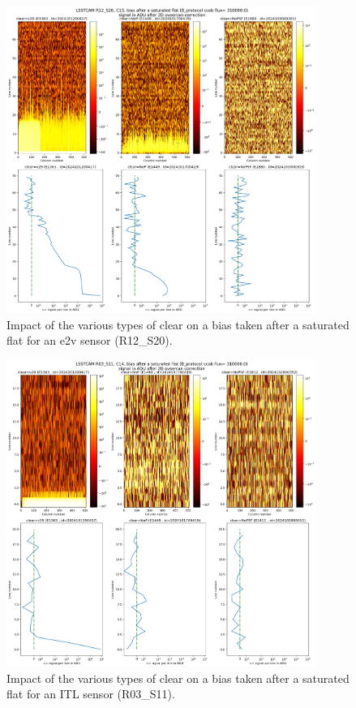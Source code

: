 \begin{figure}
\begin{centering}
\includegraphics[width=0.9\textwidth]{sections/figures/plots_R12_S20_C15_E1880_bias_2024103000303.png}
\end{centering}
\caption{Impact of the various types of clear on a bias
taken after a saturated flat for an e2v sensor (R12\_S20).}
\label{fig:clear_e2v}
\end{figure}


\begin{figure}
\begin{centering}
\includegraphics[width=0.9\textwidth]{sections/figures/plots_R03_S11_C14_E1812_bias_2024102800352.png}
\end{centering}
\caption{Impact of the various types of clear on a bias
taken after a saturated flat for an ITL sensor (R03\_S11).}
\label{fig:clear_ITL}
\end{figure}


